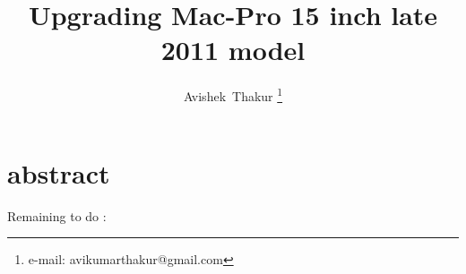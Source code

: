 \documentclass[]{article}
\begin{document}
\title{Upgrading Mac-Pro 15 inch late 2011 model}

\author{Avishek~Thakur
\thanks{e-mail: avikumarthakur@gmail.com}}

\maketitle

\section{abstract}
\label{abstract}


Remaining to do : ~\cite{abstracttitle,blindtext1,blindtext2}


\printbibliography
\end{document}
